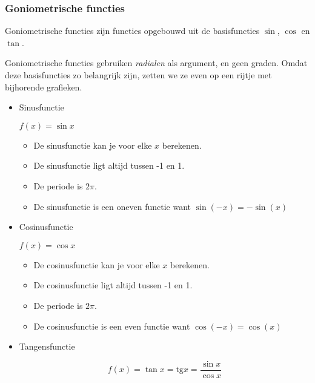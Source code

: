 \subsubsection{Goniometrische functies}

Goniometrische functies zijn functies opgebouwd uit de basisfuncties
$\sin$, $\cos$ en $\tan$.

Goniometrische functies gebruiken \emph{radialen} als argument,
en geen graden. Omdat deze basisfuncties zo belangrijk zijn, zetten
we ze even op een rijtje met bijhorende grafieken. 

\begin{itemize}
\item{Sinusfunctie}

$f(x)=\sin x$




\begin{itemize}
	\item De sinusfunctie kan je voor elke $x$ berekenen. 
	\item De sinusfunctie ligt altijd tussen -1 en 1.
	\item De periode is $2\pi$. 
	\item De sinusfunctie is een oneven functie want $\sin(-x)=-\sin(x)$
\end{itemize}

\item{Cosinusfunctie}

$f(x)=\cos x$



\begin{itemize}
	\item De cosinusfunctie kan je voor elke $x$ berekenen. 
	\item De cosinusfunctie ligt altijd tussen -1 en 1.
	\item De periode is $2\pi$. 
	\item De cosinusfunctie is een even functie want $\cos(-x)=\cos(x)$
\end{itemize}

\item{Tangensfunctie}

\begin{equation*}
f(x)=\tan x=\textrm{tg}x=\frac{\sin x}{\cos x}
\end{equation*}




\end{itemize}
